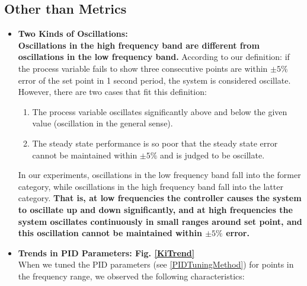 \documentclass[conference]{IEEEtran}
\begin{document}
\subsection{Other than Metrics}
\label{BehindMetrics}
\begin{itemize}
    \item \textbf{Two Kinds of Oscillations:}\\
        \textbf{Oscillations in the high frequency band are different from oscillations in the low frequency band.} According to our definition: if the process variable fails to show three consecutive points are within $\pm5\%$ error of the set point in 1 second period, the system is considered oscillate. However, there are two cases that fit this definition:
        \begin{enumerate}
            \item The process variable oscillates significantly above and below the given value (oscillation in the general sense).
            \item The steady state performance is so poor that the steady state error cannot be maintained within $\pm5\%$ and is judged to be oscillate.
        \end{enumerate}
       In our experiments, oscillations in the low frequency band fall into the former category, while oscillations in the high frequency band fall into the latter category. \textbf{That is, at low frequencies the controller causes the system to oscillate up and down significantly, and at high frequencies the system oscillates continuously in small ranges around  set point, and this oscillation cannot be maintained within $\pm5\%$ error.}
    \item \textbf{Trends in PID Parameters: Fig. \ref{KiTrend}}\\
    When we tuned the PID parameters (see \ref{PIDTuningMethod}) for points in the frequency range, we observed the following characteristics:

\end{itemize}
\end{document}
